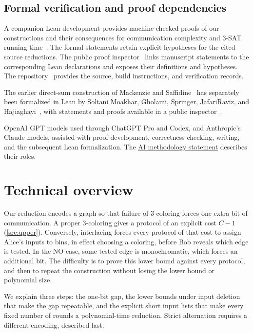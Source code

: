 \documentclass[11pt,letterpaper]{article} \usepackage[utf8]{inputenc}
\theoremstyle{plain} \newtheorem{theorem}{Theorem}[section]
\theoremstyle{definition} \newaliascnt{definition}{theorem}
\begin{document}
\subsection{Formal verification and proof dependencies}
\label{sec:formal-verification}

A companion Lean development provides machine-checked proofs of our
constructions and their consequences for communication complexity and
$3$-SAT running time~\cite{interlacing2026lean}. The formal statements
retain explicit hypotheses for the cited source reductions.
The public proof inspector~\cite{interlacing2026inspector} links manuscript
statements to the corresponding Lean declarations and exposes their
definitions and hypotheses. The repository~\cite{interlacing2026lean}
provides the source, build instructions, and verification records.

The earlier direct-sum construction of Mackenzie and
Saffidine~\cite{mackenzie2025refuting} has separately been formalized in
Lean by Soltani Moakhar, Gholami, Springer, JafariRaviz, and
Hajiaghayi~\cite{moakhar2026beyond}, with statements and proofs available in
a public inspector~\cite{beyondlibrary2026inspector}.

OpenAI GPT models used through ChatGPT Pro and Codex, and Anthropic's
Claude models, assisted with proof development, correctness checking, writing,
and the subsequent Lean formalization. The
\hyperref[sec:ai-methodology]{AI methodology statement} describes their roles.

\clearpage
\section{Technical overview}
\label{sec:overview}

Our reduction encodes a graph so that failure of $3$-coloring forces one
extra bit of communication. A proper $3$-coloring gives a protocol of an
explicit cost $C-1$ (\cref{src:upper}). Conversely, interlacing forces every
protocol of that cost to assign Alice's inputs to bins, in effect choosing a
coloring, before Bob reveals which edge is tested. In the NO case, some tested
edge is monochromatic, which forces an additional bit. The difficulty is to
prove this lower bound against every protocol, and then to repeat the
construction without losing the lower bound or polynomial size.

We explain three steps: the one-bit gap, the lower bounds under input
deletion that make the gap repeatable, and the explicit short input lists
that make every fixed number of rounds a polynomial-time reduction.
Strict alternation requires a different encoding, described last.
\end{document}
